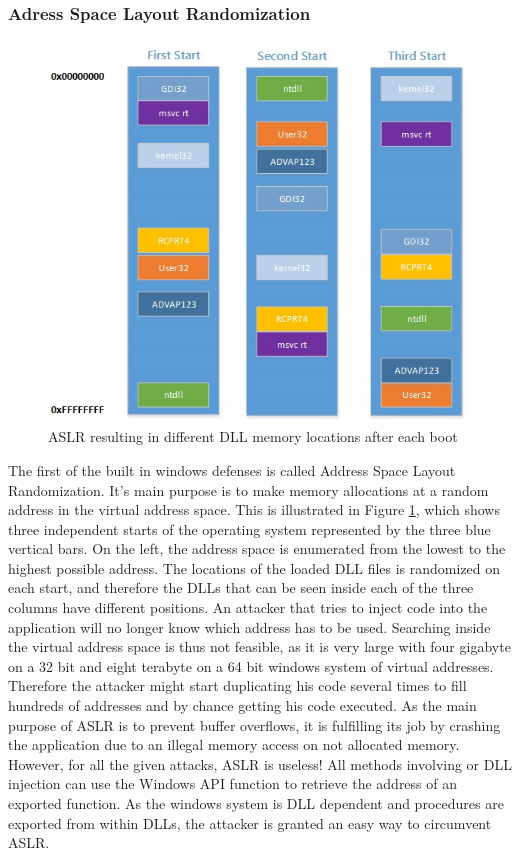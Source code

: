 \subsubsection{Adress Space Layout Randomization}
\begin{figure}[h]
\centering
\includegraphics[width=\textwidth,height=\textheight,keepaspectratio]{sections/background/defenses/aslr.jpg}
\caption{ASLR resulting in different DLL memory locations after each boot}
\label{fig:aslr}
\end{figure}
The first of the built in windows defenses is called Address Space Layout Randomization. It's main purpose is to make memory allocations at a random address in the virtual address space. This is illustrated in Figure \ref{fig:aslr}, which shows three independent starts of the operating system represented by the three blue vertical bars. On the left, the address space is enumerated from the lowest to the highest possible address. The locations of the loaded DLL files is randomized on each start, and therefore the DLLs that can be seen inside each of the three columns have different positions. An attacker that tries to inject code into the application will no longer know which address has to be used. Searching inside the virtual address space is thus not feasible, as it is very large with four gigabyte on a 32 bit and eight terabyte on a 64 bit windows system of virtual addresses. Therefore the attacker might start duplicating his code several times to fill hundreds of addresses and by chance getting his code executed. As the main purpose of ASLR is to prevent buffer overflows, it is fulfilling its job by crashing the application due to an illegal memory access on not allocated memory. However, for all the given attacks, ASLR is useless! All methods involving  or DLL injection can use the Windows API function  to retrieve the address of an exported function. As the windows system is DLL dependent and procedures are exported from within DLLs, the attacker is granted an easy way to circumvent ASLR.